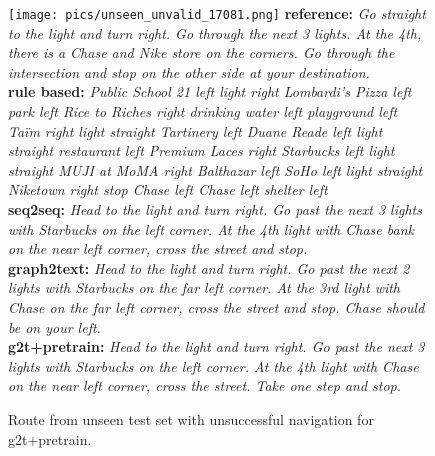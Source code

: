 \documentclass[11pt,a4paper]{article}
\begin{document}
\begin{figure*}[h]
    \texttt{[image: pics/unseen\_unvalid\_17081.png]}
    \scriptsize
    \textbf{reference:} \textit{Go straight to the light and turn right. Go through the next 3 lights. At the 4th, there is a Chase and Nike store on the corners. Go through the intersection and stop on the other side at your destination.} \\
    \textbf{rule based:} \textit{Public School 21 left light right Lombardi's Pizza left park left Rice to Riches right drinking water left playground left Taïm right light straight Tartinery left Duane Reade left light straight restaurant left Premium Laces right Starbucks left light straight MUJI at MoMA right Balthazar left SoHo left light straight Niketown right stop Chase left Chase left shelter left}\\
    \textbf{seq2seq:} \textit{Head to the light and turn right. Go past the next 3 lights with Starbucks on the left corner. At the 4th light with Chase bank on the near left corner, cross the street and stop.}\\
    \textbf{graph2text:} \textit{Head to the light and turn right. Go past the next 2 lights with Starbucks on the far left corner. At the 3rd light with Chase on the far left corner, cross the street and stop. Chase should be on your left.}\\
    \textbf{g2t+pretrain:} \textit{Head to the light and turn right. Go past the next 3 lights with Starbucks on the left corner. At the 4th light with Chase on the near left corner, cross the street. Take one step and stop.}
    \caption{Route from unseen test set with unsuccessful navigation for g2t+pretrain.}
\end{figure*}
\end{document}
